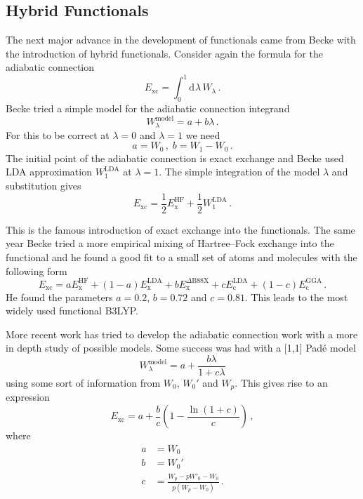 \documentclass{article}
\theoremstyle{plain}\theoremheaderfont{\normalfont\itshape}\theorembodyfont{\rmfamily}\theoremseparator{.}\newtheorem*{rem}{Remark}\newtheorem*{ex}{Example}\newtheorem*{proof}{Proof}\newtheorem*{altp}{Alternative proof}
\theoremstyle{plain}\theoremheaderfont{\normalfont\bfseries}\theorembodyfont{\rmfamily}\theoremseparator{.}\newtheorem{thm}{Theorem}[section]\newtheorem{lem}[thm]{Lemma}\newtheorem{prop}[thm]{Proposition}\newtheorem*{cor}{Corollary}\newtheorem{defn}[thm]{Definition}\newtheorem{clm}[thm]{Claim}\newtheorem{clminproof}{Claim}
\theoremstyle{break}\theoremheaderfont{\normalfont\itshape}\theorembodyfont{\rmfamily}\theoremseparator{.\medskip}\newtheorem*{proofskip}{Proof}\newtheorem*{exs}{Examples}\newtheorem*{rems}{Remarks}
\theoremstyle{break}\theoremheaderfont{\normalfont\bfseries}\theorembodyfont{\rmfamily}\theoremseparator{.\medskip}\newtheorem{lemskip}[thm]{Lemma}\newtheorem{defnskip}[thm]{Definition}\newtheorem{propskip}[thm]{Proposition}\newtheorem{thmskip}[thm]{Theorem}
\numberwithin{equation}{section}
\newcommand{\dd}[2][]{\mathrm{d}^{#1} #2\,}
\newcommand{\x}{_{\text{x}}}
\newcommand{\corr}{_{\text{c}}}
\newcommand{\xc}{_{\text{xc}}}
\begin{document}
    \subsection{Hybrid Functionals}
    The next major advance in the development of functionals came from Becke with the introduction of hybrid functionals. Consider again the formula for the adiabatic connection
    \begin{equation}
        E\xc=\int_{0}^{1}\dd{\lambda}W_{\lambda}\,.
    \end{equation}
    Becke tried a simple model for the adiabatic connection integrand
    \begin{equation}
        W_\lambda^{\text{model}}=a+b\lambda\,.
    \end{equation}
    For this to be correct at \(\lambda=0\) and \(\lambda=1\) we need
    \begin{equation}
        a=W_0\,,\; b=W_1-W_0\,.
    \end{equation}
    The initial point of the adiabatic connection is exact exchange and Becke used LDA approximation \(W_1^{\text{LDA}}\) at \(\lambda=1\). The simple integration of the model \(\lambda\) and substitution gives
    \begin{equation}
        E\xc=\frac{1}{2}E\x^{\text{HF}}+\frac{1}{2}W_1^{\text{LDA}}\,.
    \end{equation}
    
    This is the famous introduction of exact exchange into the functionals. The same year Becke tried a more empirical mixing of Hartree--Fock exchange into the functional and he found a good fit to a small set of atoms and molecules with the following form
    \begin{equation}
        E\xc=aE\x^{\text{HF}}+(1-a)E\x^{\text{LDA}}+bE\x^{\Delta\text{B88X}}+cE\corr^{\text{LDA}}+(1-c)E\corr^{\text{GGA}}\,.
    \end{equation}
    He found the parameters \(a=0.2\), \(b=0.72\) and \(c=0.81\). This leads to the most widely used functional B3LYP.

    More recent work has tried to develop the adiabatic connection work with a more in depth study of possible models. Some success was had with a [1,1] Pad\'{e} model
    \begin{equation}
        W_\lambda^{\text{model}}=a+\frac{b\lambda}{1+c\lambda}
    \end{equation}
    using some sort of information from \(W_0\), \(W_0'\) and \(W_p\). This gives rise to an expression
    \begin{equation}
        E\xc=a+\frac{b}{c}\left(1-\frac{\ln(1+c)}{c}\right)\,,
    \end{equation}
    where
    \begin{align}
        a&=W_0\\
        b&=W_0'\\
        c&=\frac{W_p-pW'_0-W_0}{p(W_p-W_0)}\,.
    \end{align}
\end{document}
